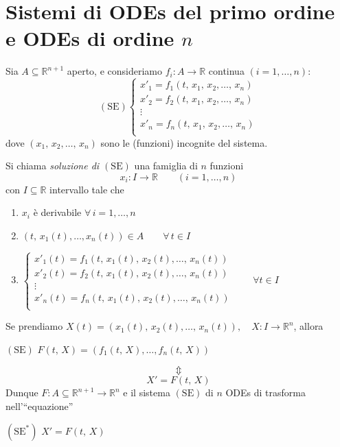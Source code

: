 \section{Sistemi di ODEs del primo ordine e ODEs di ordine $n$}
Sia $A \subseteq \mathbb{R}^{n+1}$ aperto, e consideriamo $f_i : A \longrightarrow \mathbb{R}$ continua $(i=1,\ldots,n)$:
$$
\mathrm{(SE)}
\begin{cases}
x'_{1} = f_{1} (t,\,x_1,\,x_2,\ldots,\,x_n)\\
x'_{2} = f_{2} (t,\,x_1,\,x_2,\ldots,\,x_n)\\
\vdots\\
x'_{n} = f_{n} (t,\,x_1,\,x_2,\ldots,\,x_n)\\
\end{cases}
$$
dove $(x_1,\,x_2,\ldots,\,x_n)$ sono le (funzioni) incognite del sistema.

\begin{definition}
Si chiama \emph{soluzione di $\mathrm{(SE)}$} una famiglia di $n$ funzioni
$$
x_i : I \longrightarrow \mathbb{R} \qquad (i=1,\ldots,n)
$$
con $I \subseteq \mathbb{R}$ intervallo tale che
\begin{enumerate}[labelindent=\parindent,leftmargin=*,label=\textnormal{(\roman*)},start=1]
\item $x_i$ è derivabile $\forall \, i=1,\ldots,n$
\item $(t,\,x_1(t),\ldots,x_n(t)) \in A \qquad \forall \, t \in I$
\item $
\begin{cases}
x'_{1}(t) = f_{1} (t,\,x_1(t),\,x_2(t),\ldots,\,x_n(t))\\
x'_{2}(t) = f_{2} (t,\,x_1(t),\,x_2(t),\ldots,\,x_n(t))\\
\vdots\\
x'_{n}(t) = f_{n} (t,\,x_1(t),\,x_2(t),\ldots,\,x_n(t))\\
\end{cases}
\qquad \forall t \in I
$
\end{enumerate}
\end{definition}

Se prendiamo $X(t) = (x_1(t),\,x_2(t),\ldots,\,x_n(t)), \quad X : I \longrightarrow \mathbb{R}^n$, allora
\begin{center}
$\mathrm{(SE)}$
\hfill
$\displaystyle
F(t,\,X) = \left( f_1(t,\,X),\ldots,f_n(t,\,X) \right)
$
\hfill \null \\
\end{center}
$$
\Updownarrow
$$
$$
X' = F(t,\,X)
$$
Dunque $F : A \subseteq \mathbb{R}^{n+1} \longrightarrow \mathbb{R}^n$ e il sistema $\mathrm{(SE)}$ di $n$ ODEs di trasforma nell'``equazione''
\begin{center}
$\mathrm{(SE^*)}$
\hfill
$\displaystyle
X' = F(t,\,X)
$
\hfill \null \\
\end{center}

